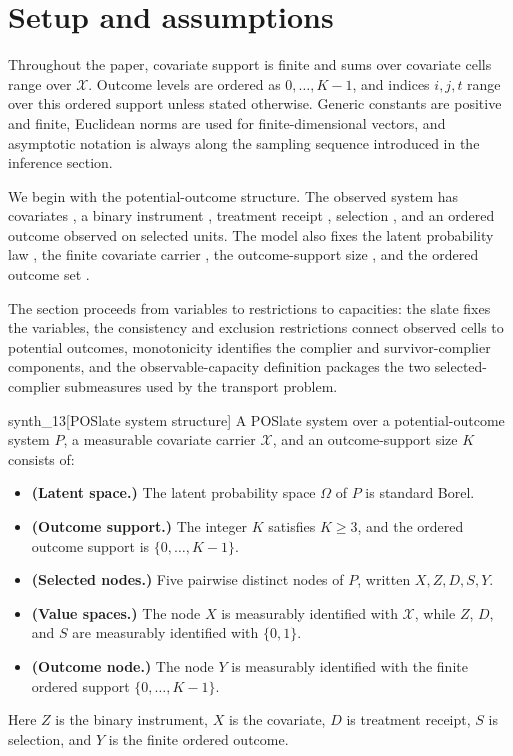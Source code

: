 \section{Setup and assumptions}\label{sec:setup}

Throughout the paper, covariate support is finite and sums over covariate cells range over \(\mathcal X\). Outcome levels are ordered as \(0,\ldots,K-1\), and indices \(i,j,t\) range over this ordered support unless stated otherwise. Generic constants are positive and finite, Euclidean norms are used for finite-dimensional vectors, and asymptotic notation is always along the sampling sequence introduced in the inference section.

We begin with the potential-outcome structure. The observed system has covariates , a binary instrument , treatment receipt , selection , and an ordered outcome  observed on selected units. The model also fixes the latent probability law , the finite covariate carrier , the outcome-support size , and the ordered outcome set .

The section proceeds from variables to restrictions to capacities: the slate fixes the variables, the consistency and exclusion restrictions connect observed cells to potential outcomes, monotonicity identifies the complier and survivor-complier components, and the observable-capacity definition packages the two selected-complier submeasures used by the transport problem.

\begin{definitionv}{synth_13}[POSlate system structure]
A POSlate system over a potential-outcome system \(P\), a measurable covariate carrier \(\mathcal X\), and an outcome-support size \(K\) consists of:
\begin{itemize}
\item \textbf{(Latent space.)} The latent probability space \(\Omega\) of \(P\) is standard Borel.
\item \textbf{(Outcome support.)} The integer \(K\) satisfies \(K\ge 3\), and the ordered outcome support is \(\{0,\ldots,K-1\}\).
\item \textbf{(Selected nodes.)} Five pairwise distinct nodes of \(P\), written \(X,Z,D,S,Y\).
\item \textbf{(Value spaces.)} The node \(X\) is measurably identified with \(\mathcal X\), while \(Z\), \(D\), and \(S\) are measurably identified with \(\{0,1\}\).
\item \textbf{(Outcome node.)} The node \(Y\) is measurably identified with the finite ordered support \(\{0,\ldots,K-1\}\).
\end{itemize}
Here \(Z\) is the binary instrument, \(X\) is the covariate, \(D\) is treatment receipt, \(S\) is selection, and \(Y\) is the finite ordered outcome.
\end{definitionv}

